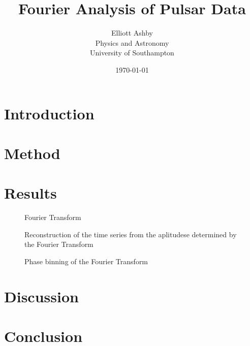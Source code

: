 \documentclass[reqno]{amsart}
\title{Fourier Analysis of Pulsar Data}
\author[Elliott Ashby]{Elliott Ashby \\ Physics and Astronomy \\ University of Southampton}
\date{\monthyeardate\today}
\numberwithin{equation}{section}
\numberwithin{figure}{section}
\begin{document}
\begin{abstract}
\end{abstract}
\vspace*{-2cm}
\maketitle
\tableofcontents
\newpage
\section{Introduction}
\section{Method}
\section{Results}
\begin{figure}[ht]
    \centering
    
    \caption{Fourier Transform}
    \label{fig:ft}
\end{figure}

\begin{figure}[ht]
    \centering
    
    \caption{Reconstruction of the time series from the aplitudese determined by the Fourier Transform}
    \label{fig:reconstruction}
\end{figure}

\begin{figure}[ht]
    \centering
    
    \caption{Phase binning of the Fourier Transform}
    \label{fig:phasebins}
\end{figure}
\section{Discussion}
\section{Conclusion}



\end{document}

